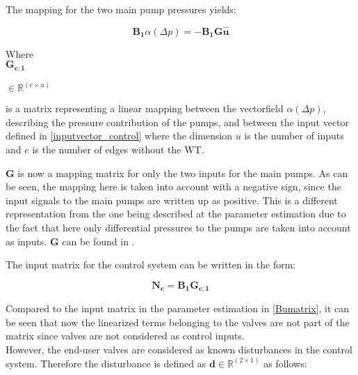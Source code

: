 The mapping for the two main pump pressures yields:

\begin{equation}
\pmb{B_1} \alpha(\Delta p) = -\pmb{B_1} \pmb{G} \pmb{\hat{u}}
\label{mapping_main}
\end{equation}

\begin{minipage}[t]{0.12\textwidth}
Where\\
\hspace*{8mm} $\pmb{G_{c;1}}$ 
\end{minipage}
\begin{minipage}[t]{0.12\textwidth}
\vspace*{2mm}$\in \pmb{\mathbb{R}}^{(e \times u)} $ 
\end{minipage}
\begin{minipage}[t]{0.74\textwidth}
\vspace*{2mm}
is a matrix representing a linear mapping between the vectorfield $\alpha(\Delta p)$, describing the pressure contribution of the pumps, and between the input vector defined in \eqref{inputvector_control} where the dimension $u$ is the number of inputs and $e$ is the number of edges without the WT. 
\end{minipage} 

$\bm{G}$ is now a mapping matrix for only the two inputs for the main pumps. As can be seen, the mapping here is taken into account with a negative sign, since the input signals to the main pumps are written up as positive. This is a different representation from the one being described at the parameter estimation due to the fact that here only differential pressures to the pumps are taken into account as inputs. $\pmb{G}$ can be found in .

The input matrix for the control system can be written in the form: 

\begin{equation}
  \pmb{N_c} =  \pmb{B_1}\pmb{G_{c;1}}  
\label{inputmatrix_control}	
\end{equation}

Compared to the input matrix in the parameter estimation in \eqref{Bumatrix}, it can be seen that now the linearized terms belonging to the valves are not part of the matrix since valves are not considered as control inputs. 
\\
However, the end-user valves are considered as known disturbances in the control system. Therefore the disturbance is defined as $\pmb{d} \in \pmb{\mathbb{R}}^{(2 \times 1)}$ as follows: 

